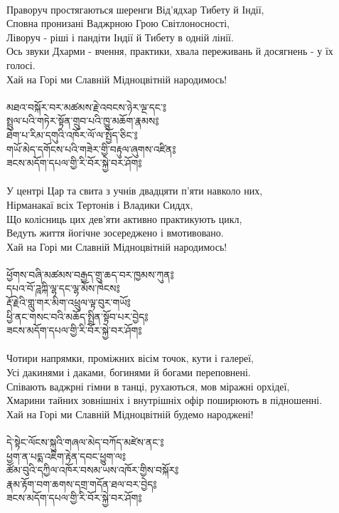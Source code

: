 \\
\ru
Праворуч простягаються шеренги Від'ядхар Тибету й Індії, \\
Сповна пронизані Ваджрною Грою Світлоносності, \\
Ліворуч - ріші і пандіти Індії й Тибету в одній лінії.\\
Ось звуки Дхарми - вчення, практики, хвала переживань й досягнень - у їх голосі.\\
Хай на Горі ми Славній Мідноцвітній народимось!\\
\\
{\ti མཐའ་བསྐོར་བར་མཚམས་རྗེ་འབངས་ཉེར་ལྔ་དང་༔\\
སྤྲུལ་པའི་གཏེར་སྟོན་གྲུབ་པའི་ཁྱུ་མཆོག་རྣམས༔\\
ཐེག་པ་རིམ་དགུའི་འཁོར་ལོ་ལ་སྤྱོད་ཅིང་༔\\
གཡོ་མེད་དགོངས་པའི་གཟེར་གྱི་བརྟུལ་ཞུགས་འཛིན༔\\
ཟངས་མདོག་དཔལ་གྱི་རི་བོར་སྐྱེ་བར་ཤོག༔}\\
\\
\ru
У центрі Цар та свита з учнів двадцяти п'яти навколо них,\\
Нірманакаї всіх Тертонів і Владики Сиддх,\\
Що колісниць цих дев'яти активно практикують цикл,\\
Ведуть життя йогічне зосереджено і вмотивовано.\\
Хай на Горі ми Славній Мідноцвітній народимось!\\
\\
{\ti ཕྱོགས་བཞི་མཚམས་བརྒྱད་གྲུ་ཆད་བར་ཁྱམས་ཀུན༔\\
དཔའ་བོ་ཌཱཀྐི་ལྷ་དང་ལྷ་མོས་ཁེངས༔\\
རྡོ་རྗེའི་གླུ་གར་མིག་འཕྲུལ་ལྟ་བུར་གཡོ༔\\
ཕྱི་ནང་གསང་བའི་མཆོད་སྤྲིན་སྟོབ་པར་བྱེད༔\\
ཟངས་མདོག་དཔལ་གྱི་རི་བོར་སྐྱེ་བར་ཤོག༔}\\
\\
Чотири напрямки, проміжних вісім точок, кути і галереї,\\
Усі дакинями і даками, богинями й богами переповнені.\\
Співають ваджрні гімни в танці, рухаються, мов міражні орхідеї, \\
Хмарини тайних зовнішніх і внутрішніх офір поширюють в підношенні.\\
Хай на Горі ми Славній Мідноцвітній будемо народжені!\\
\\
{\ti དེ་སྟེང་ལོངས་སྐུའི་གཞལ་མེད་བཀོད་མཛེས་ནང་༔\\
ཕྱག་ན་པདྨ་འཇིག་རྟེན་དབང་ཕྱུག་ལ༔\\
ཚོམ་བུའི་དཀྱིལ་འཁོར་བསམ་ཡས་འཁོར་གྱིས་བསྐོར༔\\
རྣམ་རྟོག་བག་ཆགས་དགྲ་གདོན་ཐལ་བར་བྱེད༔\\
ཟངས་མདོག་དཔལ་གྱི་རི་བོར་སྐྱེ་བར་ཤོག༔}\\
